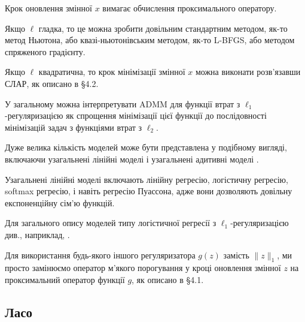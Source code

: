 \begin{remark}
    Крок оновлення змінної $x$ вимагає обчислення проксимального оператору. 
\end{remark}

\begin{example}
    Якщо $\ell$ гладка, то це можна зробити довільним стандартним методом, як-то метод Ньютона, або квазі-ньютонівським методом, як-то L-BFGS, або методом спряженого градієнту.
\end{example}

\begin{example}
    Якщо $\ell$ квадратична, то крок мінімізації змінної $x$ можна виконати розв'язавши СЛАР, як описано в \S4.2.
\end{example}

\begin{remark}
    У загальному можна інтерпретувати ADMM для функції втрат з $\ell_1$-регуляризацією як спрощення мінімізації цієї функції до послідовності мінімізацій задач з функціями втрат з $\ell_2$.
\end{remark}

\begin{remark}
    Дуже велика кількість моделей може бути представлена у подібному вигляді, включаючи узагальнені лінійні моделі \cite{122} і узагальнені адитивні моделі \cite{94}.
\end{remark}

\begin{example}
    Узагальнені лінійні моделі включають лінійну регресію, логістичну регресію, softmax регресію, і навіть регресію Пуассона, адже вони дозволяють довільну експоненційну сім'ю функцій. 
\end{example}

\begin{remark}
    Для загального опису моделей типу логістичної регресії з $\ell_1$-ре\-гу\-ля\-ри\-за\-ці\-є\-ю див., наприклад, \cite[\S4.4.4]{95}.
\end{remark}

\begin{remark}
    Для використання будь-якого іншого регуляризатора $g(z)$ замість $\|z\|_1$, ми просто замінюємо оператор м'якого порогування у кроці оновлення змінної $z$ на проксимальний оператор функції $g$, як описано в \S4.1.
\end{remark}

\subsection{Ласо}

